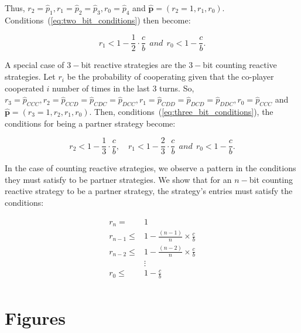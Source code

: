 \documentclass{article}
\theoremstyle{definition}
\begin{document}
Thus, $r_2 = \hat{p}_1, r_1 = \hat{p}_2 =  \hat{p}_3, r_0 = \hat{p}_4$ and
$\mathbf{\hat{p}}=(r_2=1, r_1, r_0)$. Conditions~(\ref{eq:two_bit_conditions})
then become:

\begin{equation}\label{eq:counting_two_bit_conditions}
  \displaystyle r_1 < 1-\frac{1}{2} \cdot \frac{c}{b} ~~and~~ r_0 < 1\!-\! \frac{c}{b}.
\end{equation}


A special case of $3-$bit reactive strategies are the $3-$bit counting reactive
strategies. Let $r_i$ be the probability of cooperating given that the co-player
cooperated $i$ number of times in the last 3 turns. So, $r_3 = \hat{p}_{CCC},
r_2 = \hat{p}_{CCD} =  \hat{p}_{CDC} = \hat{p}_{DCC}, r_1 = \hat{p}_{CDD} =
\hat{p}_{DCD} =  \hat{p}_{DDC}, r_0 = \hat{p}_{CCC}$ and $\mathbf{\hat{p}}=(r_3=1,
r_2, r_1, r_0)$. Then, conditions~(\ref{eq:three_bit_conditions}), the
conditions for being a partner strategy become:

\begin{equation}\label{eq:counting_three_bit_conditions}
  \displaystyle r_2 < 1- \frac{1}{3} \cdot \frac{c}{b}, \quad r_1 < 1- \frac{2}{3} \cdot \frac{c}{b} ~~and~~ r_0 < 1\!-\! \frac{c}{b}.
\end{equation}


In the case of counting reactive strategies, we observe a pattern in the
conditions they must satisfy to be partner strategies. We show that for an $n-$bit
counting reactive strategy to be a partner strategy, the strategy's entries must
satisfy the conditions:

\begin{align*}
    r_{n}   = & 1 \\
    r_{n-1} \leq & 1  - \frac{(n - 1)}{n} \times \frac{c}{b}\\
    r_{n-2} \leq & 1  - \frac{(n - 2)}{n} \times \frac{c}{b}\\
    & \vdots \\
    r_{0} \leq &  1  - \frac{c}{b}\\
\end{align*}

\section{Figures}

\end{document}
